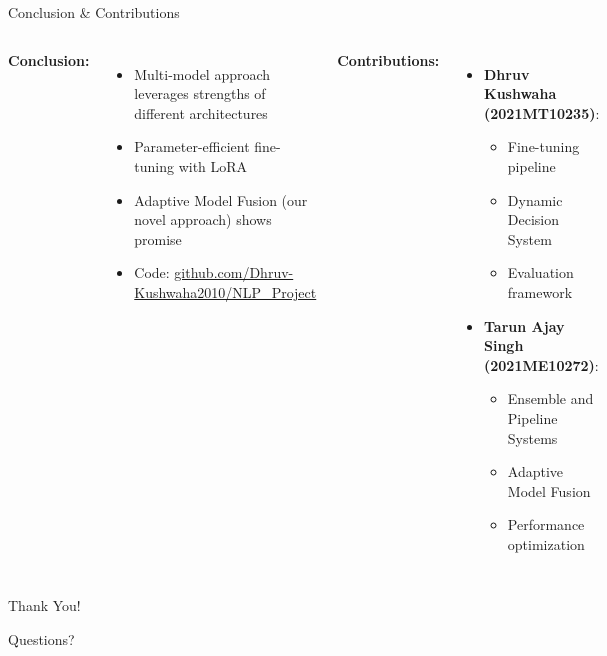 \documentclass{beamer}
\begin{document}
\begin{frame}{Conclusion \& Contributions}
\begin{columns}[T]
\textbf{Conclusion:}
\begin{itemize}
    \item Multi-model approach leverages strengths of different architectures
    \item Parameter-efficient fine-tuning with LoRA
    \item Adaptive Model Fusion (our novel approach) shows promise
    \item Code: \url{github.com/Dhruv-Kushwaha2010/NLP_Project} %
\end{itemize}

\textbf{Contributions:}
\begin{itemize}
    \item \textbf{Dhruv Kushwaha (2021MT10235)}:
    \begin{itemize}
        \item Fine-tuning pipeline
        \item Dynamic Decision System
        \item Evaluation framework
    \end{itemize}
    \item \textbf{Tarun Ajay Singh (2021ME10272)}:
    \begin{itemize}
        \item Ensemble and Pipeline Systems
        \item Adaptive Model Fusion
        \item Performance optimization
    \end{itemize}
\end{itemize}
\end{columns}
\end{frame}

\begin{frame}{Thank You!}
\begin{center}
\Huge Questions?
\end{center}
\end{frame}
\end{document}
